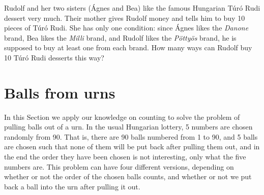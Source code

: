 \begin{exercise}\label{ex:TuroRudi}
Rudolf and her two sisters (Ágnes and Bea) like the famous Hungarian Túró Rudi dessert very much. 
Their mother gives Rudolf money and tells him to buy 10 pieces of Túró Rudi. 
She has only one condition: since Ágnes likes the \emph{Danone} brand, 
Bea likes the \emph{Milli} brand, and Rudolf likes the \emph{Pöttyös} brand, 
he is supposed to buy at least one from each brand. 
How many ways can Rudolf buy 10 Túró Rudi desserts this way? 
\end{exercise}


\section{Balls from urns}\label{sec:ballsurns}

In this Section we apply our knowledge on counting to solve the problem of pulling balls out of a urn. 
In the usual Hungarian lottery, 
5 numbers are chosen randomly from 90. 
That is, there are 90 balls numbered from 1 to 90, 
and 5 balls are chosen such that none of them will be put back after pulling them out, 
and in the end the order they have been chosen is not interesting, 
only what the five numbers are. 
This problem can have four different versions, 
depending on whether or not the order of the chosen balls counts, 
and whether or not we put back a ball into the urn after pulling it out. 

